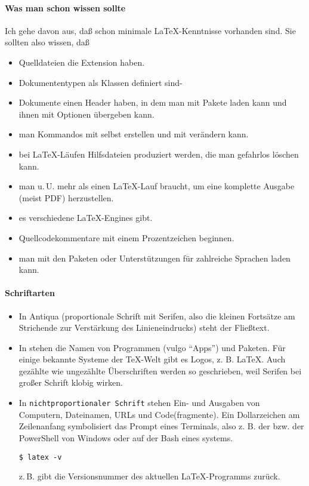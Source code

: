 \documentclass[
	11pt,        %
	table,       %
	twoside,     %
	notitlepage, %
]{scrreprt}
\begin{document}
\paragraph{Was man schon wissen sollte}
Ich gehe davon aus, daß schon minimale \LaTeX-Kenntnisse vorhanden sind. Sie sollten also wissen, daß \textellipsis
\begin{itemize}
\item \textellipsis Quelldateien die Extension  haben.
\item \textellipsis Dokumententypen als Klassen definiert sind-
\item \textellipsis Dokumente einen Header haben, in dem man mit  Pakete laden kann und ihnen mit \Kbd{[key=value]} Optionen übergeben kann.
\item \textellipsis man Kommandos mit  selbst erstellen und mit  verändern kann.
\item \textellipsis bei \LaTeX-Läufen Hilfsdateien produziert werden, die man gefahrlos löschen kann.
\item \textellipsis man u.\,U. mehr als einen \LaTeX-Lauf braucht, um eine komplette Ausgabe (meist PDF) herzustellen.
\item \textellipsis es verschiedene \LaTeX-Engines gibt.
\item \textellipsis Quellcodekommentare mit einem Prozentzeichen beginnen.
\item \textellipsis man mit den Paketen  oder  Unterstützungen für zahlreiche Sprachen laden kann.
\end{itemize}

\paragraph{Schriftarten}
\begin{itemize}
\item In Antiqua (proportionale Schrift mit Serifen, also die kleinen Fortsätze am Strichende zur Verstärkung des Linieneindrucks) steht der Fließtext.
\item In  stehen die Namen von Programmen (vulgo \enquote{Apps}) und Paketen. Für einige bekannte Systeme der \TeX-Welt gibt es Logos, z. B. \LaTeX. Auch gezählte wie ungezählte Überschriften werden so geschrieben, weil Serifen bei großer Schrift klobig wirken.
\item In \texttt{nichtproportionaler Schrift} stehen Ein- und Ausgaben von Computern, Dateinamen, URLs und Code(fragmente). Ein Dollarzeichen am Zeilenanfang symbolisiert das Prompt eines Terminals, also z. B.  der  bzw.  der PowerShell von Windows oder  auf der Bash eines systems.
\begin{lstlisting}
$ latex -v
\end{lstlisting}
z.\,B. gibt die Versionsnummer des aktuellen \LaTeX-Programms zurück.
\end{itemize}
\end{document}
